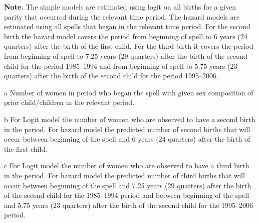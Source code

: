 \documentclass[12pt,letterpaper]{article}
\begin{document}
\begin{table}[htbp]
\begin{center}
\begin{footnotesize}
\begin{threeparttable}
\begin{tablenotes} \tiny
\item \hspace*{-0.5em} \textbf{Note.} 
The simple models are estimated using logit on all births for a given parity that
occurred during the relevant time period.
The hazard models are estimated using all spells that began in the relevant time period.
For the second birth the hazard model covers the period from beginning of spell to 6 
years (24 quarters) after the birth of the first child.
For the third birth it covers the period from beginning of spell to 7.25 years 
(29 quarters) after the birth of the second child for the period 1985--1994 and from 
beginning of spell to 5.75 years (23 quarters) after the birth of the second child for 
the period 1995--2006.
\item[a] Number of women in period who began the spell with given sex composition of prior 
child/children in the relevant period.
\item[b] For Logit model the number of women who are observed to have a second birth
in the period. 
For hazard model the predicted number of second births that will occur between beginning 
of the spell and 6 years (24 quarters) after the birth of the first child.
\item[c] For Logit model the number of women who are observed to have a third birth
in the period. 
For hazard model the predicted number of third births that will occur between beginning of 
the spell and 7.25 years (29 quarters) after the birth of the second child for the
1985--1994 period and between beginning of the spell and 5.75 years (23 quarters) after 
the birth of the second child for the 1995--2006 period.
\end{tablenotes}
\end{threeparttable}
\end{footnotesize}
\end{center}
\end{table}
\end{document}
